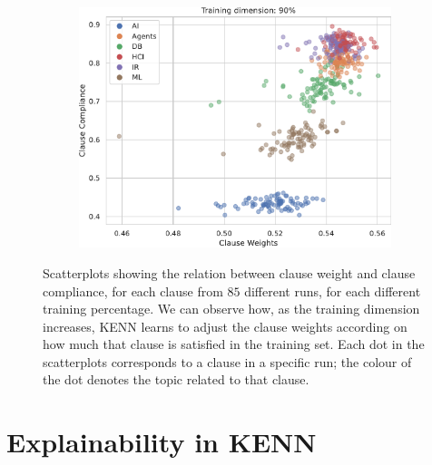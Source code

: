 \begin{figure}
\begin{subfigure}{0.5\textwidth}
	\includegraphics[width=0.95\linewidth]{figures/scatter_90.pdf}
	\label{fig:ee}	
\end{subfigure}
\caption{Scatterplots showing the relation between clause weight and clause compliance, for each clause from $85$ different runs, for each different training percentage. We can observe how, as the training dimension increases, KENN learns to adjust the clause weights according on how much that clause is satisfied in the training set. Each dot in the scatterplots corresponds to a clause in a specific run; the colour of the dot denotes the topic related to that clause.}
\label{fig:corrplots}
\end{figure}
 
 \section{Explainability in KENN}

